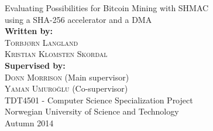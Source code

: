 \documentclass[a4paper]{report}
\begin{document}
\begin{titlepage}
	\begin{center}
		{\huge Evaluating Possibilities for Bitcoin Mining with SHMAC}\\[0.5cm]
		{\large using a SHA-256 accelerator and a DMA}\\[5cm]

		\textbf{Written by:}\\
		\textsc{Torbjørn Langland}\\
		\textsc{Kristian Klomsten Skordal}\\[3em]
		\textbf{Supervised by:}\\
		\textsc{Donn Morrison} (Main supervisor)\\
		\textsc{Yaman Umuroğlu} (Co-supervisor)\\[1cm]

		\vfill
		{\large TDT4501 - Computer Science Specialization Project}\\[0.2em]
		{\large Norwegian University of Science and Technology}\\[0.2em]
		{Autumn 2014}
	\end{center}
\end{titlepage}



\tableofcontents












\end{document}
